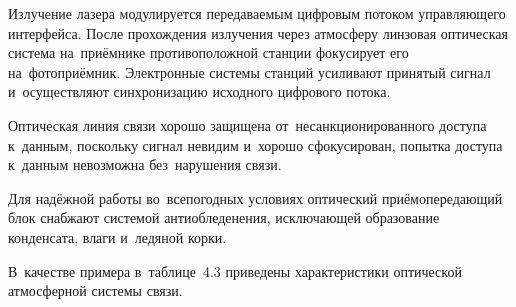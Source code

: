 \documentclass[
	a4paper,
	oneside,
	BCOR = 10mm,
	DIV = 12,
	12pt,
	headings = normal,
]{scrartcl}
\begin{document}
				Излучение лазера модулируется передаваемым цифровым потоком управляющего интерфейса. После прохождения излучения через атмосферу линзовая оптическая система на~приёмнике противоположной станции фокусирует его на~фотоприёмник. Электронные системы станций усиливают принятый сигнал и~осуществляют синхронизацию исходного цифрового потока.

				Оптическая линия связи хорошо защищена от~несанкционированного доступа к~данным, поскольку сигнал невидим и~хорошо сфокусирован, попытка доступа к~данным невозможна без~нарушения связи.

				Для надёжной работы во~всепогодных условиях оптический приёмопередающий блок снабжают системой антиобледенения, исключающей образование конденсата, влаги и~ледяной корки. 

				В~качестве примера в~таблице~4.3 приведены характеристики оптической атмосферной системы связи. 
\end{document}
